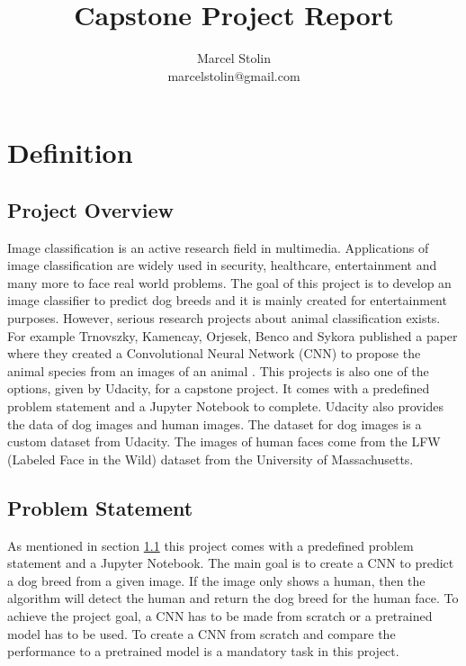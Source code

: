 \documentclass{article}
\title{Capstone Project Report}
\date{}
\author{Marcel Stolin \\ marcelstolin@gmail.com}
\begin{document}
\maketitle

\section{Definition} \label{s_definition}

\subsection{Project Overview} \label{su_project_overview}
Image classification is an active research field in multimedia. Applications of image classification are widely used in security, healthcare, entertainment and many more to face real world problems.\newline
The goal of this project is to develop an image classifier to predict dog breeds and it is mainly created for entertainment purposes. However, serious research projects about animal classification exists. For example Trnovszky, Kamencay, Orjesek, Benco and Sykora published a paper where they created a Convolutional Neural Network (CNN) to propose the animal species from an images of an animal \cite{animal_rec}.\newline
This projects is also one of the options, given by Udacity, for a capstone project. It comes with a predefined problem statement and a Jupyter Notebook to complete. Udacity also provides the data of dog images and human images. The dataset for dog images is a custom dataset from Udacity. The images of human faces come from the LFW (Labeled Face in the Wild) \cite{lfw} dataset from the University of Massachusetts.

\subsection{Problem Statement} \label{su_problem_statement}
As mentioned in section \ref{su_project_overview} this project comes with a predefined problem statement and a Jupyter Notebook. The main goal is to create a CNN to predict a dog breed from a given image. If the image only shows a human, then the algorithm will detect the human and return the dog breed for the human face. To achieve the project goal, a CNN has to be made from scratch or a pretrained model has to be used. To create a CNN from scratch and compare the performance to a pretrained model is a mandatory task in this project.\newline
\end{document}
